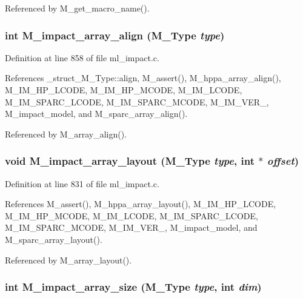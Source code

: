 Referenced by M\_\-get\_\-macro\_\-name().
\subsubsection{\setlength{\rightskip}{0pt plus 5cm}int M\_\-impact\_\-array\_\-align (\bf{M\_\-Type} {\em type})}\label{ml__impact_8c_92393a8481f5f66d461a68d6daaec28f}




Definition at line 858 of file ml\_\-impact.c.

References \_\-struct\_\-M\_\-Type::align, M\_\-assert(), M\_\-hppa\_\-array\_\-align(), M\_\-IM\_\-HP\_\-LCODE, M\_\-IM\_\-HP\_\-MCODE, M\_\-IM\_\-LCODE, M\_\-IM\_\-SPARC\_\-LCODE, M\_\-IM\_\-SPARC\_\-MCODE, M\_\-IM\_\-VER\_, M\_\-impact\_\-model, and M\_\-sparc\_\-array\_\-align().

Referenced by M\_\-array\_\-align().
\subsubsection{\setlength{\rightskip}{0pt plus 5cm}void M\_\-impact\_\-array\_\-layout (\bf{M\_\-Type} {\em type}, int $\ast$ {\em offset})}\label{ml__impact_8c_cb0a343bbcbffa45ccf991b9591ac643}




Definition at line 831 of file ml\_\-impact.c.

References M\_\-assert(), M\_\-hppa\_\-array\_\-layout(), M\_\-IM\_\-HP\_\-LCODE, M\_\-IM\_\-HP\_\-MCODE, M\_\-IM\_\-LCODE, M\_\-IM\_\-SPARC\_\-LCODE, M\_\-IM\_\-SPARC\_\-MCODE, M\_\-IM\_\-VER\_, M\_\-impact\_\-model, and M\_\-sparc\_\-array\_\-layout().

Referenced by M\_\-array\_\-layout().
\subsubsection{\setlength{\rightskip}{0pt plus 5cm}int M\_\-impact\_\-array\_\-size (\bf{M\_\-Type} {\em type}, int {\em dim})}\label{ml__impact_8c_3205c56b2c4afe8a50fa5be7feee38ca}




